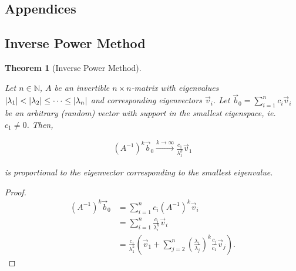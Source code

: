 \documentclass{article}
\theoremstyle{plain} %
\newtheorem{theorem}{Theorem}[section]
\theoremstyle{convention} %
\theoremstyle{remark} %
\numberwithin{equation}{section}
\begin{document}
\begin{appendix}

\section*{Appendices} %
\renewcommand{\thesubsection}{\Alph{subsection}} %

\renewcommand{\thetheorem}{\Alph{subsection}.\arabic{theorem}}
\renewcommand{\thedefinition}{\Alph{subsection}.\arabic{definition}}
\renewcommand{\thecorollary}{\Alph{subsection}.\arabic{corollary}}
\renewcommand{\theexample}{\Alph{subsection}.\arabic{example}}
\renewcommand{\theprop}{\Alph{subsection}.\arabic{prop}}
\renewcommand{\thelemma}{\Alph{subsection}.\arabic{lemma}}

\subsection{Inverse Power Method}

\label{sec:inverse_power_method}

\begin{theorem}[Inverse Power Method]

\label{thm:inverse_power_method}

Let $n \in \mathbb{N}$, $A$ be an invertible $n \times n$-matrix with eigenvalues $\abs{\lambda_1} < \abs{\lambda_2} \leq \dots \leq \abs{\lambda_n}$ and corresponding eigenvectors $\vec{v}_i$. Let $\vec{b}_0 = \sum_{i=1}^n c_i \vec{v}_i$ be an arbitrary (random) vector with support in the smallest eigenspace, ie. $c_1 \neq 0$. Then,

\begin{align*}
  (A^{-1})^k \vec{b}_0 \xrightarrow{k\rightarrow\infty} \frac{c_1}{\lambda_1^k} \vec{v}_1
\end{align*}

is proportional to the eigenvector corresponding to the smallest eigenvalue.

\end{theorem}

\begin{proof}

\begin{align*}
  (A^{-1})^k \vec{b}_0 &= \sum_{i=1}^n c_i (A^{-1})^k \vec{v}_i\\
  &= \sum_{i=1}^n \frac{c_i}{\lambda_i^{k}} \vec{v}_i\\
  &= \frac{c_1}{\lambda_1^k} \left( \vec{v}_1 + \sum_{j=2}^n \left(\frac{\lambda_1}{\lambda_j}\right)^k \frac{c_j}{c_1} \vec{v}_j \right).
\end{align*}


\end{proof}
\end{appendix}
\end{document}
